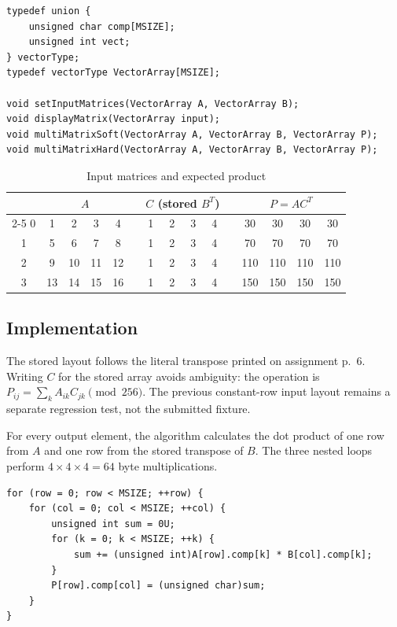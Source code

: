 \documentclass[11pt,a4paper]{article}
\begin{document}
\begin{lstlisting}[style=cppstyle,caption={Packed matrix row}]
typedef union {
    unsigned char comp[MSIZE];
    unsigned int vect;
} vectorType;
typedef vectorType VectorArray[MSIZE];

void setInputMatrices(VectorArray A, VectorArray B);
void displayMatrix(VectorArray input);
void multiMatrixSoft(VectorArray A, VectorArray B, VectorArray P);
void multiMatrixHard(VectorArray A, VectorArray B, VectorArray P);
\end{lstlisting}

\begin{table}[H]
\centering
\caption{Input matrices and expected product}
\begin{tabular}{c cccc c cccc c cccc}
\toprule
& \multicolumn{4}{c}{$A$} && \multicolumn{4}{c}{$C$ (stored $B^T$)} && \multicolumn{4}{c}{$P=A C^T$} \\
\cmidrule{2-5}\cmidrule{7-10}\cmidrule{12-15}
0 & 1&2&3&4 && 1&2&3&4 && 30&30&30&30 \\
1 & 5&6&7&8 && 1&2&3&4 && 70&70&70&70 \\
2 & 9&10&11&12 && 1&2&3&4 && 110&110&110&110 \\
3 & 13&14&15&16 && 1&2&3&4 && 150&150&150&150 \\
\bottomrule
\end{tabular}
\end{table}

\subsection{Implementation}
The stored layout follows the literal transpose printed on assignment p.~6.
Writing $C$ for the stored array avoids ambiguity: the operation is
$P_{ij}=\sum_k A_{ik}C_{jk}\pmod{256}$. The previous constant-row input
layout remains a separate regression test, not the submitted fixture.

For every output element, the algorithm calculates the dot product of one row
from $A$ and one row from the stored transpose of $B$. The three nested loops
perform $4\times4\times4=64$ byte multiplications.

\begin{lstlisting}[style=cppstyle,caption={Software matrix multiplication}]
for (row = 0; row < MSIZE; ++row) {
    for (col = 0; col < MSIZE; ++col) {
        unsigned int sum = 0U;
        for (k = 0; k < MSIZE; ++k) {
            sum += (unsigned int)A[row].comp[k] * B[col].comp[k];
        }
        P[row].comp[col] = (unsigned char)sum;
    }
}
\end{lstlisting}
\end{document}
